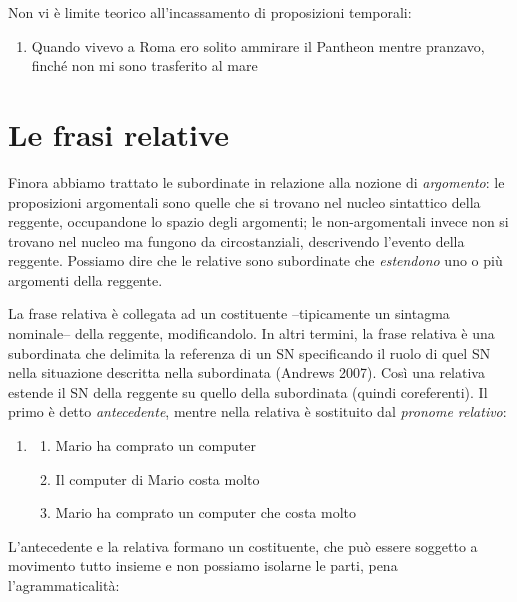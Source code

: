 \documentclass[
  a4paper,
  twoside,
  11pt,
  chapterprefix=false,
  bibliography=totocnumbered,
  listof=flat]{scrbook}
\providecommand{\tightlist}{%
  \setlength{\itemsep}{0pt}\setlength{\parskip}{0pt}}
\begin{document}
Non vi è limite teorico all'incassamento di proposizioni temporali:

\begin{enumerate}
\def\labelenumi{(\arabic{enumi})}
\setcounter{enumi}{120}
\tightlist
\item
  Quando vivevo a Roma ero solito ammirare il Pantheon mentre pranzavo, finché non mi sono trasferito al mare
\end{enumerate}

\hypertarget{le-frasi-relative}{%
\chapter{Le frasi relative}\label{le-frasi-relative}}

Finora abbiamo trattato le subordinate in relazione alla nozione di \emph{argomento}: le proposizioni argomentali sono quelle che si trovano nel nucleo sintattico della reggente, occupandone lo spazio degli argomenti; le non-argomentali invece non si trovano nel nucleo ma fungono da circostanziali, descrivendo l'evento della reggente. Possiamo dire che le relative sono subordinate che \emph{estendono} uno o più argomenti della reggente.

La frase relativa è collegata ad un costituente --tipicamente un sintagma nominale-- della reggente, modificandolo.
In altri termini, la frase relativa è una subordinata che delimita la referenza di un SN specificando il ruolo di quel SN nella situazione descritta nella subordinata (Andrews 2007).
Così una relativa estende il SN della reggente su quello della subordinata (quindi coreferenti). Il primo è detto \emph{antecedente}, mentre nella relativa è sostituito dal \emph{pronome relativo}:

\begin{enumerate}
\def\labelenumi{(\arabic{enumi})}
\setcounter{enumi}{121}
\item
  \begin{enumerate}
  \def\labelenumii{\alph{enumii}.}
  \tightlist
  \item
    Mario ha comprato un computer
  \item
    Il computer di Mario costa molto
  \item
    Mario ha comprato un computer che costa molto
  \end{enumerate}
\end{enumerate}

L'antecedente e la relativa formano un costituente, che può essere soggetto a movimento tutto insieme e non possiamo isolarne le parti, pena l'agrammaticalità:
\end{document}
